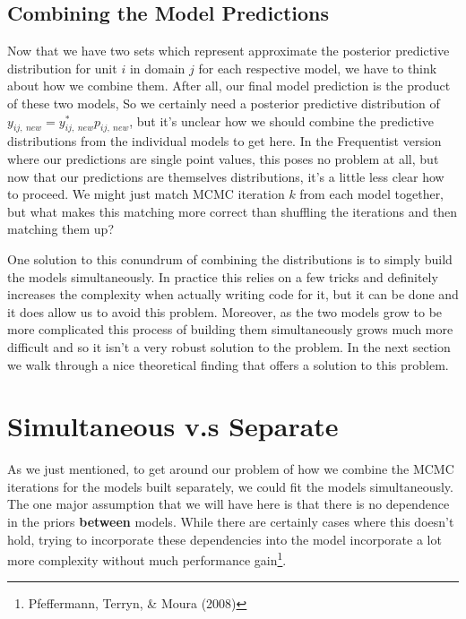 \documentclass[12pt,twoside]{reedthesis}
\begin{document}
\hypertarget{combining-the-model-predictions}{%
\subsection{Combining the Model Predictions}\label{combining-the-model-predictions}}

Now that we have two sets which represent approximate the posterior predictive distribution for unit \(i\) in domain \(j\) for each respective model, we have to think about how we combine them. After all, our final model prediction is the product of these two models, So we certainly need a posterior predictive distribution of \(y_{ij, \ new} = y_{ij, \ new}^*p_{ij, \ new}\), but it's unclear how we should combine the predictive distributions from the individual models to get here. In the Frequentist version where our predictions are single point values, this poses no problem at all, but now that our predictions are themselves distributions, it's a little less clear how to proceed. We might just match MCMC iteration \(k\) from each model together, but what makes this matching more correct than shuffling the iterations and then matching them up?

One solution to this conundrum of combining the distributions is to simply build the models simultaneously. In practice this relies on a few tricks and definitely increases the complexity when actually writing code for it, but it can be done and it does allow us to avoid this problem. Moreover, as the two models grow to be more complicated this process of building them simultaneously grows much more difficult and so it isn't a very robust solution to the problem. In the next section we walk through a nice theoretical finding that offers a solution to this problem.

\hypertarget{simultaneous-v.s-separate}{%
\section{Simultaneous v.s Separate}\label{simultaneous-v.s-separate}}

As we just mentioned, to get around our problem of how we combine the MCMC iterations for the models built separately, we could fit the models simultaneously. The one major assumption that we will have here is that there is no dependence in the priors \textbf{between} models. While there are certainly cases where this doesn't hold, trying to incorporate these dependencies into the model incorporate a lot more complexity without much performance gain\footnote{Pfeffermann, Terryn, \& Moura (2008)}.
\end{document}
